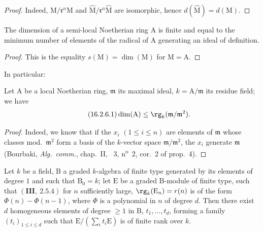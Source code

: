 
\begin{proof}
Indeed, $\mathrm{M}/\mathfrak{r}^n\mathrm{M}$ and $\widehat{\mathrm{M}}/\mathfrak{r}^n\widehat{\mathrm{M}}$ are isomorphic, hence $d(\widehat{\mathrm{M}})=d(\mathrm{M})$.
\end{proof}

\begin{corollary}[16.2.5]
\label{0.16.2.5}
The dimension of a semi-local Noetherian ring $\mathrm{A}$ is finite and equal to the minimum number of elements of the radical of $\mathrm{A}$ generating an ideal of definition.
\end{corollary}

\begin{proof}
This is the equality $s(\mathrm{M})=\dim(\mathrm{M})$ for $\mathrm{M}=\mathrm{A}$.
\end{proof}

In particular:

\begin{corollary}[16.2.6]
\label{0.16.2.6}
Let $\mathrm{A}$ be a local Noetherian ring, $\mathfrak{m}$ its maximal ideal, $k=\mathrm{A}/\mathfrak{m}$ its residue field; we have
\begin{equation}
\label{0.16.2.6.1}
\tag{16.2.6.1}
  \dim(\mathrm{A})\leq\rg_k(\mathfrak{m}/\mathfrak{m}^2).
\end{equation}
\end{corollary}

\begin{proof}
Indeed, we know that if the $x_i$ $(1\leq i\leq n)$ are elements of $\mathfrak{m}$ whose classes mod.~$\mathfrak{m}^2$ form a basis of the $k$-vector space $\mathfrak{m}/\mathfrak{m}^2$, the $x_i$ generate $\mathfrak{m}$ (Bourbaki, \emph{Alg.~comm.}, chap.~II, \textsection~3, n\textsuperscript{o}~2, cor.~2 of prop.~4).
\end{proof}

\begin{proposition}[16.2.7]
\label{0.16.2.7}
Let $k$ be a field, $\mathrm{B}$ a graded $k$-algebra of finite type generated by its elements of degree $1$ and such that $\mathrm{B}_0=k$; let $\mathrm{E}$ be a graded $\mathrm{B}$-module of finite type, such that $(\mathbf{III},~2.5.4)$ for $n$ sufficiently large, $\rg_k(\mathrm{E}_n)=r(n)$ is of the form $\Phi(n)-\Phi(n-1)$, where $\Phi$ is a polynomial in $n$ of degree $d$.
Then there exist $d$ homogeneous elements of degree $\geq 1$ in $\mathrm{B}$, $t_1,\ldots,t_d$, forming a family $(t_i)_{1\leq i\leq d}$ such that $\mathrm{E}/(\sum_i t_i\mathrm{E})$ is of finite rank over $k$.
\end{proposition}

